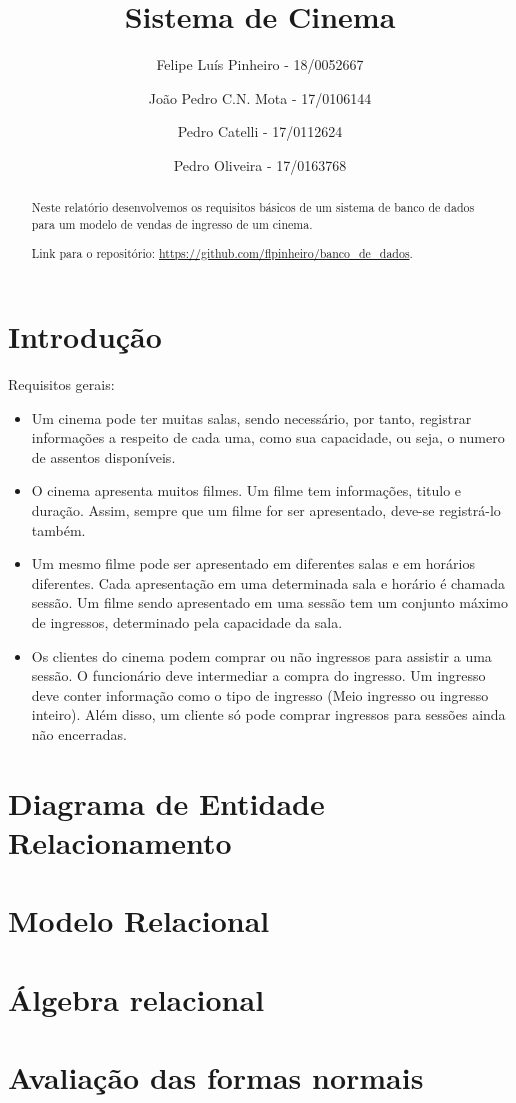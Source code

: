 \documentclass[a4paper,10pt]{article}
\title{Sistema de Cinema}
\author{
Felipe Luís Pinheiro - 18/0052667 \and 
João Pedro C.N. Mota - 17/0106144 \and 
Pedro Catelli - 17/0112624 \and
Pedro Oliveira - 17/0163768}
\begin{document}
\maketitle

\begin{abstract}
Neste relatório desenvolvemos os requisitos básicos de um sistema de banco de dados para um modelo de vendas de ingresso de um cinema. 

Link para o repositório: \url{https://github.com/flpinheiro/banco_de_dados}. 
\end{abstract}

\section{Introdução}

Requisitos gerais:

\begin{itemize}
	\item Um cinema pode ter muitas salas, sendo necessário, por tanto, registrar informações a respeito de cada uma, como sua capacidade, ou seja, o numero de assentos disponíveis.
	\item O cinema apresenta muitos filmes. Um filme tem informações, titulo e duração. Assim, sempre que um filme for ser apresentado, deve-se registrá-lo também.
	\item Um mesmo filme pode ser apresentado em diferentes salas e em horários diferentes. Cada apresentação em uma determinada sala e horário é chamada sessão. Um filme sendo apresentado em uma sessão tem um conjunto máximo de ingressos, determinado pela capacidade da sala.
	\item Os clientes do cinema podem comprar ou não ingressos para assistir a uma sessão. O
funcionário deve intermediar a compra do ingresso. Um ingresso deve conter informação
como o tipo de ingresso (Meio ingresso ou ingresso inteiro). Além disso, um cliente só pode
comprar ingressos para sessões ainda não encerradas.
\end{itemize}

\section{Diagrama de Entidade Relacionamento}

\section{Modelo Relacional}

\section{Álgebra relacional}

\section{Avaliação das formas normais}

%
% 
\end{document}
